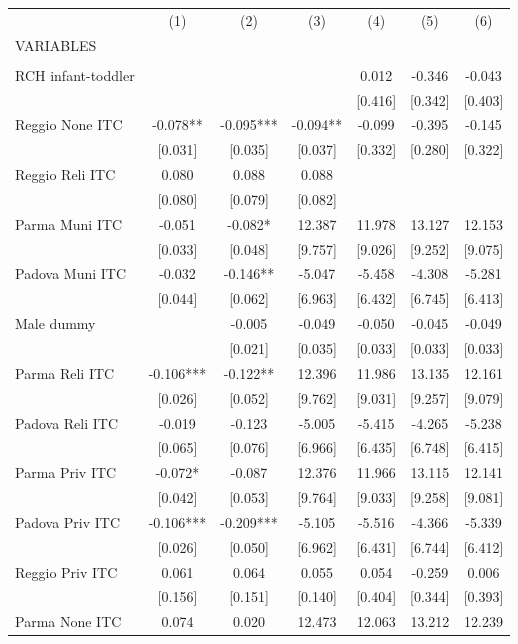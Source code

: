 \begin{tabular}{lcccccc} \hline
 & (1) & (2) & (3) & (4) & (5) & (6) \\
VARIABLES &  &  &  &  &  &  \\ \hline
 &  &  &  &  &  &  \\
RCH infant-toddler &  &  &  & 0.012 & -0.346 & -0.043 \\
 &  &  &  & [0.416] & [0.342] & [0.403] \\
Reggio None ITC & -0.078** & -0.095*** & -0.094** & -0.099 & -0.395 & -0.145 \\
 & [0.031] & [0.035] & [0.037] & [0.332] & [0.280] & [0.322] \\
Reggio Reli ITC & 0.080 & 0.088 & 0.088 &  &  &  \\
 & [0.080] & [0.079] & [0.082] &  &  &  \\
Parma Muni ITC & -0.051 & -0.082* & 12.387 & 11.978 & 13.127 & 12.153 \\
 & [0.033] & [0.048] & [9.757] & [9.026] & [9.252] & [9.075] \\
Padova Muni ITC & -0.032 & -0.146** & -5.047 & -5.458 & -4.308 & -5.281 \\
 & [0.044] & [0.062] & [6.963] & [6.432] & [6.745] & [6.413] \\
Male dummy &  & -0.005 & -0.049 & -0.050 & -0.045 & -0.049 \\
 &  & [0.021] & [0.035] & [0.033] & [0.033] & [0.033] \\
Parma Reli ITC & -0.106*** & -0.122** & 12.396 & 11.986 & 13.135 & 12.161 \\
 & [0.026] & [0.052] & [9.762] & [9.031] & [9.257] & [9.079] \\
Padova Reli ITC & -0.019 & -0.123 & -5.005 & -5.415 & -4.265 & -5.238 \\
 & [0.065] & [0.076] & [6.966] & [6.435] & [6.748] & [6.415] \\
Parma Priv ITC & -0.072* & -0.087 & 12.376 & 11.966 & 13.115 & 12.141 \\
 & [0.042] & [0.053] & [9.764] & [9.033] & [9.258] & [9.081] \\
Padova Priv ITC & -0.106*** & -0.209*** & -5.105 & -5.516 & -4.366 & -5.339 \\
 & [0.026] & [0.050] & [6.962] & [6.431] & [6.744] & [6.412] \\
Reggio Priv ITC & 0.061 & 0.064 & 0.055 & 0.054 & -0.259 & 0.006 \\
 & [0.156] & [0.151] & [0.140] & [0.404] & [0.344] & [0.393] \\
Parma None ITC & 0.074 & 0.020 & 12.473 & 12.063 & 13.212 & 12.239 \\

\end{tabular}
